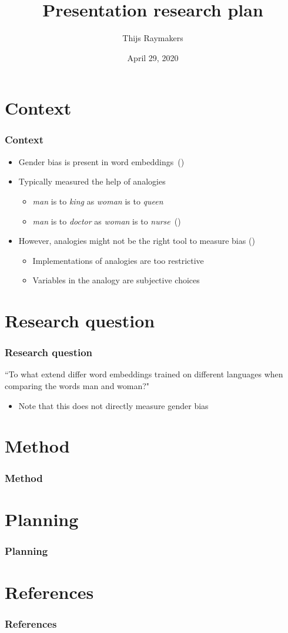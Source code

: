 \documentclass{beamer}
\author{Thijs Raymakers}
\title{Presentation research plan}
\date{April 29, 2020}
\newcommand{\bcite}[1]{(\cite{#1})}
\begin{document}
\section{Context}
\begin{frame}
\frametitle{Context}
\begin{itemize}
    \item Gender bias is present in word embeddings~\bcite{bolukbasi_2016_quantifying_stereotypes}
    \pause
    \item Typically measured the help of analogies
    \begin{itemize}
        \item \textit{man} is to \textit{king} as \textit{woman} is to \textit{queen}
        \item \textit{man} is to \textit{doctor} as \textit{woman} is to \textit{nurse}~\bcite{bolukbasi_2016_quantifying_stereotypes}
    \end{itemize}
    \pause
    \item However, analogies might not be the right tool to measure bias \bcite{2019arXiv190509866N}
    \begin{itemize}
        \item Implementations of analogies are too restrictive
        \item Variables in the analogy are subjective choices
    \end{itemize}
\end{itemize}
\end{frame}

\section{Research question}
\begin{frame}
\frametitle{Research question}

``To what extend differ word embeddings trained on different languages when comparing
the words man and woman?"

\pause
\begin{itemize}
    \item Note that this does not directly measure gender bias
\end{itemize}

\end{frame}

\section{Method}
\begin{frame}
\frametitle{Method}
\end{frame}

\section{Planning}
\begin{frame}
\frametitle{Planning}
\end{frame}

\section{References}
\begin{frame}[allowframebreaks]
\frametitle{References}
\printbibliography[heading=none]
\end{frame}
\end{document}
